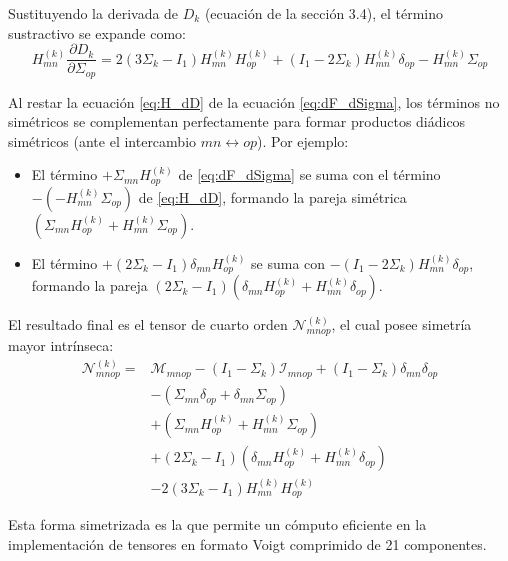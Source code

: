\documentclass[12pt]{article}
\begin{document}
Sustituyendo la derivada de $D_k$ (ecuación de la sección 3.4), el término sustractivo se expande como:
\begin{equation}
    H_{mn}^{(k)} \frac{\partial D_k}{\partial \Sigma_{op}} = 2(3\Sigma_k - I_1)H_{mn}^{(k)}H_{op}^{(k)} + (I_1 - 2\Sigma_k)H_{mn}^{(k)}\delta_{op} - H_{mn}^{(k)}\Sigma_{op} \label{eq:H_dD}
\end{equation}

Al restar la ecuación \eqref{eq:H_dD} de la ecuación \eqref{eq:dF_dSigma}, los términos no simétricos se complementan perfectamente para formar productos diádicos simétricos (ante el intercambio $mn \leftrightarrow op$). Por ejemplo:
\begin{itemize}
    \item El término $+ \Sigma_{mn}H_{op}^{(k)}$ de \eqref{eq:dF_dSigma} se suma con el término $- (- H_{mn}^{(k)}\Sigma_{op})$ de \eqref{eq:H_dD}, formando la pareja simétrica $(\Sigma_{mn}H_{op}^{(k)} + H_{mn}^{(k)}\Sigma_{op})$.
    \item El término $+ (2\Sigma_k - I_1)\delta_{mn}H_{op}^{(k)}$ se suma con $- (I_1 - 2\Sigma_k)H_{mn}^{(k)}\delta_{op}$, formando la pareja $(2\Sigma_k - I_1)(\delta_{mn}H_{op}^{(k)} + H_{mn}^{(k)}\delta_{op})$.
\end{itemize}

El resultado final es el tensor de cuarto orden $\mathcal{N}_{mnop}^{(k)}$, el cual posee simetría mayor intrínseca:
\begin{align}
    \mathcal{N}_{mnop}^{(k)} = & \mathcal{M}_{mnop} - (I_1 - \Sigma_k)\mathcal{I}_{mnop} + (I_1 - \Sigma_k)\delta_{mn}\delta_{op} \nonumber \\
    & - (\Sigma_{mn}\delta_{op} + \delta_{mn}\Sigma_{op}) \nonumber \\
    & + (\Sigma_{mn}H^{(k)}_{op} + H^{(k)}_{mn}\Sigma_{op}) \nonumber \\
    & + (2\Sigma_k - I_1)(\delta_{mn}H^{(k)}_{op} + H^{(k)}_{mn}\delta_{op}) \nonumber \\
    & - 2(3\Sigma_k - I_1)H^{(k)}_{mn}H^{(k)}_{op}
\end{align}

Esta forma simetrizada es la que permite un cómputo eficiente en la implementación de tensores en formato Voigt comprimido de 21 componentes.
\end{document}
